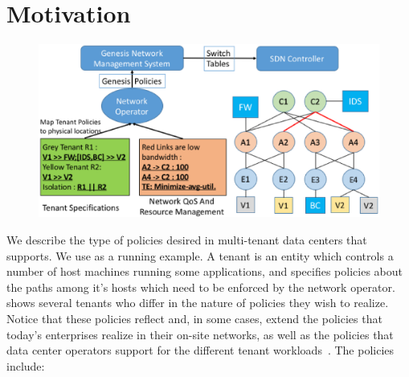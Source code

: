 \section{Motivation}
\begin{figure}
	\includegraphics[width=\columnwidth,center]{figures/architecture.eps}
	\label{fig:architecture}
\end{figure}



We describe the type of policies desired in multi-tenant data centers
that \Name supports.
We use  as a running example. A tenant is an
entity which controls a number of host machines running some applications,
and specifies policies about the paths among it's hosts which need to be enforced
by the network operator.  shows several
tenants who differ in the nature of policies they wish to realize. 
Notice that these policies reflect and, in some cases, extend the
policies that today's enterprises realize in their on-site networks, as
well as the policies that data center operators support for the different 
tenant 
workloads~\cite{mpa-imc15}.  The policies include:



